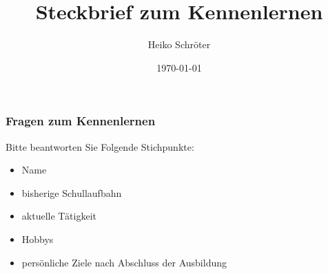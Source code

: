 \documentclass{beamer}
\title{Steckbrief zum Kennenlernen}
\subtitle{}
\author{Heiko Schröter}
\date{\today}
\begin{document}

\frame
{
  \frametitle{Fragen zum Kennenlernen}
{\begin{Large}
{\large Bitte beantworten Sie Folgende Stichpunkte:}
\begin{itemize}
\item Name
\item bisherige Schullaufbahn
\item aktuelle Tätigkeit
\item Hobbys
\item persönliche Ziele nach Abschluss der Ausbildung
\end{itemize}
\end{Large}}
}
\end{document}
